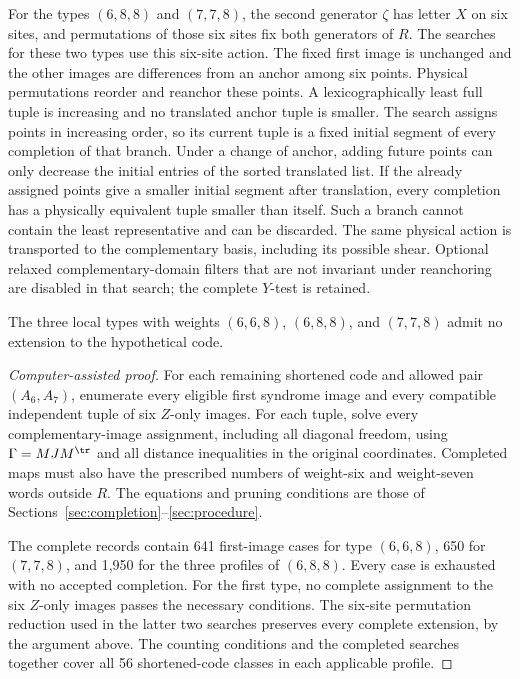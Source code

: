 For the types \((6,8,8)\) and \((7,7,8)\), the second generator
\(\zeta\) has letter \(X\) on six sites, and permutations of those six
sites fix both generators of \(R\). The searches for these two types
use this six-site action. The fixed first image is unchanged and the
other images are differences from an anchor among six points. Physical
permutations reorder and reanchor these points. A lexicographically
least full tuple is increasing and no translated anchor tuple is
smaller. The search assigns points in increasing order, so its current
tuple is a fixed initial segment of every completion of that branch.
Under a change of anchor, adding future points can only decrease the
initial entries of the sorted translated list. If the already assigned
points give a smaller initial segment after translation, every
completion has a physically equivalent tuple smaller than itself. Such a
branch cannot contain the least representative and can be discarded.
The same physical action is transported to the complementary basis,
including its possible shear. Optional relaxed complementary-domain
filters that are not invariant under reanchoring are disabled in that
search; the complete \(Y\)-test is retained.

\begin{proposition}\label{prop:17-mixed}
The three local types with weights \((6,6,8)\), \((6,8,8)\), and
\((7,7,8)\) admit no extension to the hypothetical code.
\end{proposition}
\begin{proof}[Computer-assisted proof]
For each remaining shortened code and allowed pair \((A_6,A_7)\),
enumerate every
eligible first syndrome image and every compatible independent tuple of
six \(Z\)-only images. For each tuple, solve every complementary-image
assignment, including all diagonal freedom, using
\(\Gamma=MJM^\tr\) and all distance inequalities in the original coordinates.
Completed maps must also have the prescribed numbers of weight-six and
weight-seven words outside \(R\). The equations and pruning conditions
are those of Sections~\ref{sec:completion}--\ref{sec:procedure}.

The complete records contain 641 first-image cases for type \((6,6,8)\),
650 for \((7,7,8)\), and 1,950 for the three profiles of \((6,8,8)\).
Every case is exhausted with no accepted completion. For the first type,
no complete assignment to the six \(Z\)-only images passes the
necessary conditions. The six-site permutation reduction used in the
latter two searches preserves every complete extension, by the argument
above. The counting conditions and the completed searches together cover
all 56 shortened-code classes in each applicable profile.
\end{proof}

